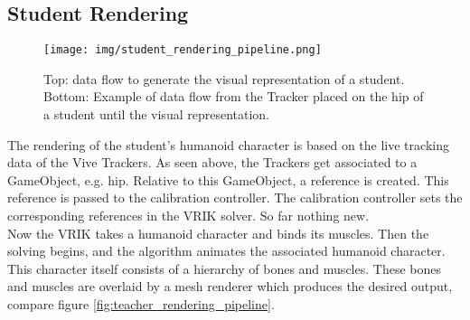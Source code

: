 \subsection{Student Rendering}
\begin{sidewaysfigure}
	\centering
	\texttt{[image: img/student\_rendering\_pipeline.png]}
	\caption{Top: data flow to generate the visual representation of a student. Bottom: Example of data flow from the Tracker placed on the hip of a student until the visual representation.}
	\label{fig:student_rendering_pipeline}
\end{sidewaysfigure}
The rendering of the student's humanoid character is based on the live tracking data of the Vive Trackers. As seen above, the Trackers get associated to a GameObject, e.g. hip. Relative to this GameObject, a reference is created. This reference is passed to the calibration controller. The calibration controller sets the corresponding references in the VRIK solver. So far nothing new.\\
Now the VRIK takes a humanoid character and binds its muscles. Then the solving begins, and the algorithm animates the associated humanoid character. This character itself consists of a hierarchy of bones and muscles. These bones and muscles are overlaid by a mesh renderer which produces the desired output, compare figure \ref{fig:teacher_rendering_pipeline}.

